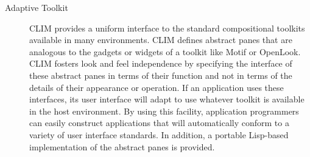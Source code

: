 \begin{description}
\item [Adaptive Toolkit] CLIM provides a uniform interface to the standard
compositional toolkits available in many environments.  CLIM defines abstract
panes that are analogous to the gadgets or widgets of a toolkit like Motif or
OpenLook.  CLIM fosters look and feel independence by specifying the interface
of these abstract panes in terms of their function and not in terms of the
details of their appearance or operation.  If an application uses these
interfaces, its user interface will adapt to use whatever toolkit is available
in the host environment.  By using this facility, application programmers can
easily construct applications that will automatically conform to a variety of
user interface standards.  In addition, a portable Lisp-based implementation of
the abstract panes is provided.

\end{description}
